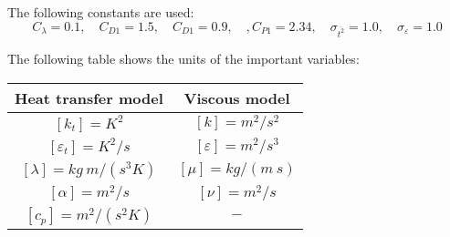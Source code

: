 \documentclass[paper=a4, fontsize=12pt]{scrartcl} %
\newcommand{\eps}{{\varepsilon}}
\begin{document}
The following constants are used:
\begin{equation}
C_\lambda=0.1, \quad C_{D1}=1.5, \quad C_{D1}=0.9, \quad, C_{P1}=2.34, \quad \sigma_{\overline{t^2}}=1.0, \quad \sigma_{\eps}=1.0
\end{equation}


The following table shows the units of the important variables: 
\begin{center}
\begin{tabular}{ c | c }
 Heat transfer model & Viscous model   \\ \hline
 $\left[k_t\right]= K^2$ & $\left[k\right]= m^2 / s^2$  \\
  $\left[\varepsilon_t\right]= K^2/s$ & $\left[\varepsilon\right]= m^2 / s^3$  \\ 
  $\left[\lambda\right]= kg \ m / (s^3 K)$ & $\left[\mu\right]= kg /(m \ s)$  \\
    $\left[\alpha\right]= m^2 /s $ & $\left[\nu\right]= m^2 /s$  \\ 
        $\left[c_p\right]= m^2 /(s^2 K) $ & $-$  \\ \hline
\end{tabular}
\end{center}
\end{document}
